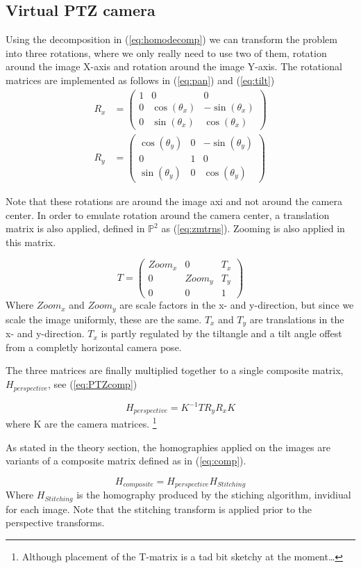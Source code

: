 \subsection{Virtual PTZ camera}
Using the decomposition in (\ref{eq:homodecomp}) we can transform the problem into three rotations, where we only really need to use two of them, rotation around the image X-axis and rotation around the image Y-axis. The rotational matrices are implemented as follows in (\ref{eq:pan}) and (\ref{eq:tilt})
	\begin{align}
		R_x &=\begin{pmatrix}1 & 0 & 0 \\
			0 & \cos(\theta_x) & -\sin(\theta_x) \\
			0 & \sin(\theta_x) & \cos(\theta_x)
		\end{pmatrix} \label{eq:pan}\\
		R_y&=\begin{pmatrix} \cos(\theta_y) & 0 & -\sin(\theta_y) \\
			0 & 1 & 0 \\
			\sin(\theta_y) & 0 & \cos(\theta_y)
		\end{pmatrix} \label{eq:tilt}
	\end{align}

	Note that these rotations are around the image axi and not around the camera center. In order to emulate rotation around the camera center, a translation matrix is also applied, defined in $\mathbb{P}^2$ as (\ref{eq:zmtrns}). Zooming is also applied in this matrix.

	\begin{equation}
		T=\begin{pmatrix}
			Zoom_x & 0 & T_x \\
			0 & Zoom_y & T_y \\
			0 & 0 & 1
		\end{pmatrix} \label{eq:zmtrns}
	\end{equation}
	Where $Zoom_x$ and $Zoom_y$ are scale factors in the x- and y-direction, but since we scale the image uniformly, these are the same. $T_x$ and $T_y$ are translations in the x- and y-direction. $T_x$ is partly regulated by the tiltangle and a tilt angle offest from a completly horizontal camera pose.

	The three matrices are finally multiplied together to a single composite matrix, $H_{perspective}$, see (\ref{eq:PTZcomp})

	\begin{equation}
		H_{perspective}=K^{-1}TR_yR_xK
		\label{eq:PTZcomp}
	\end{equation}
	where K are the camera matrices. \footnote{Although placement of the T-matrix is a tad bit sketchy at the moment\dots}

	As stated in the theory section, the homographies applied on the images are variants of a composite matrix defined as in (\ref{eq:comp}).

	\begin{equation}
		H_{composite}=H_{perspective}H_{Stitching}
		\label{eq:comp}
	\end{equation}
	Where $H_{Stitching}$ is the homography produced by the stiching algorithm, invidiual for each image. Note that the stitching transform is applied prior to the perspective transforms.
